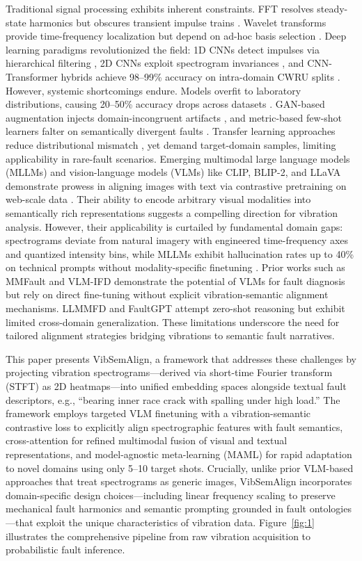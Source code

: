 Traditional signal processing exhibits inherent constraints. FFT resolves steady-state harmonics but obscures transient impulse trains \cite{cite10}. Wavelet transforms provide time-frequency localization but depend on ad-hoc basis selection \cite{cite11}. Deep learning paradigms revolutionized the field: 1D CNNs detect impulses via hierarchical filtering \cite{cite12}, 2D CNNs exploit spectrogram invariances \cite{cite13}, and CNN-Transformer hybrids achieve 98--99\% accuracy on intra-domain CWRU splits \cite{cite15}. However, systemic shortcomings endure. Models overfit to laboratory distributions, causing 20--50\% accuracy drops across datasets \cite{cite17}. GAN-based augmentation injects domain-incongruent artifacts \cite{cite18}, and metric-based few-shot learners falter on semantically divergent faults \cite{cite19}. Transfer learning approaches reduce distributional mismatch \cite{cite25}, yet demand target-domain samples, limiting applicability in rare-fault scenarios. Emerging multimodal large language models (MLLMs) and vision-language models (VLMs) like CLIP, BLIP-2, and LLaVA demonstrate prowess in aligning images with text via contrastive pretraining on web-scale data \cite{cite20}\cite{cite21}. Their ability to encode arbitrary visual modalities into semantically rich representations suggests a compelling direction for vibration analysis. However, their applicability is curtailed by fundamental domain gaps: spectrograms deviate from natural imagery with engineered time-frequency axes and quantized intensity bins, while MLLMs exhibit hallucination rates up to 40\% on technical prompts without modality-specific finetuning \cite{cite27}\cite{cite28}\cite{cite29}. Prior works such as MMFault \cite{cite23} and VLM-IFD \cite{cite24} demonstrate the potential of VLMs for fault diagnosis but rely on direct fine-tuning without explicit vibration-semantic alignment mechanisms. LLMMFD \cite{cite25} and FaultGPT \cite{cite26} attempt zero-shot reasoning but exhibit limited cross-domain generalization. These limitations underscore the need for tailored alignment strategies bridging vibrations to semantic fault narratives.

This paper presents VibSemAlign, a framework that addresses these challenges by projecting vibration spectrograms---derived via short-time Fourier transform (STFT) as 2D heatmaps---into unified embedding spaces alongside textual fault descriptors, e.g., ``bearing inner race crack with spalling under high load.'' The framework employs targeted VLM finetuning with a vibration-semantic contrastive loss to explicitly align spectrographic features with fault semantics, cross-attention for refined multimodal fusion of visual and textual representations, and model-agnostic meta-learning (MAML) for rapid adaptation to novel domains using only 5--10 target shots. Crucially, unlike prior VLM-based approaches that treat spectrograms as generic images, VibSemAlign incorporates domain-specific design choices---including linear frequency scaling to preserve mechanical fault harmonics and semantic prompting grounded in fault ontologies---that exploit the unique characteristics of vibration data. Figure~\ref{fig:1} illustrates the comprehensive pipeline from raw vibration acquisition to probabilistic fault inference.

